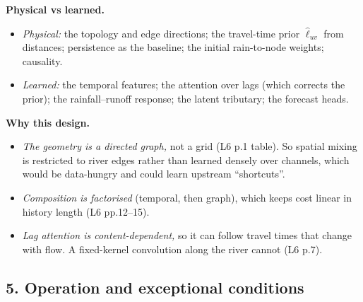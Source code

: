 \documentclass[11pt]{article}
\begin{document}
\noindent\textbf{Physical vs learned.}
\begin{itemize}
\item \emph{Physical:} the topology and edge directions; the travel-time prior $\hat\ell_{uv}$ from distances; persistence as the baseline; the initial rain-to-node weights; causality.
\item \emph{Learned:} the temporal features; the attention over lags (which corrects the prior); the rainfall--runoff response; the latent tributary; the forecast heads.
\end{itemize}

\noindent\textbf{Why this design.}
\begin{itemize}
\item \emph{The geometry is a directed graph,} not a grid (L6 p.1 table). So spatial mixing is restricted to river edges rather than learned densely over channels, which would be data-hungry and could learn upstream ``shortcuts''.
\item \emph{Composition is factorised} (temporal, then graph), which keeps cost linear in history length (L6 pp.12--15).
\item \emph{Lag attention is content-dependent,} so it can follow travel times that change with flow. A fixed-kernel convolution along the river cannot (L6 p.7).
\end{itemize}

\subsection*{5. Operation and exceptional conditions}
\end{document}
